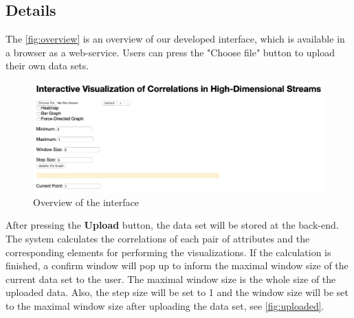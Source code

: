 




\subsection{Details}
\label{sec:Visualization:Details}
The \autoref{fig:overview} is an overview of our developed interface, which is available in a browser as a web-service. Users can press the "Choose file" button to upload their own data sets.\\

\begin{figure}[h]
	\centering
	\includegraphics[width=15cm]{pictures/overview}
	\caption{Overview of the interface}
	\label{fig:overview}
\end{figure}

After pressing the \textbf{Upload} button, the data set will be stored at the back-end. The system calculates the correlations of each pair of attributes and the corresponding elements for performing the visualizations. If the calculation is finished, a confirm window will pop up to inform the maximal window size of the current data set to the user. The maximal window size is the whole size of the uploaded data. Also, the step size will be set to 1 and the window size will be set to the maximal window size after uploading the data set, see \autoref{fig:uploaded}.\\

